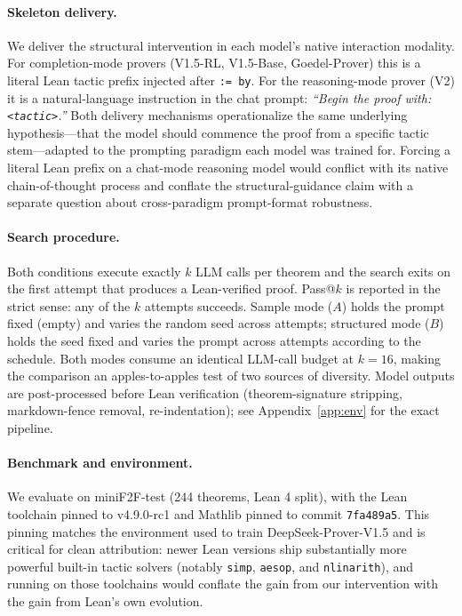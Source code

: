 \documentclass{article}
\begin{document}
\paragraph{Skeleton delivery.}
We deliver the structural intervention in each model's native interaction modality. For completion-mode provers (V1.5-RL, V1.5-Base, Goedel-Prover) this is a literal Lean tactic prefix injected after \texttt{:= by}. For the reasoning-mode prover (V2) it is a natural-language instruction in the chat prompt: \emph{``Begin the proof with: \texttt{<tactic>}.''} Both delivery mechanisms operationalize the same underlying hypothesis---that the model should commence the proof from a specific tactic stem---adapted to the prompting paradigm each model was trained for. Forcing a literal Lean prefix on a chat-mode reasoning model would conflict with its native chain-of-thought process and conflate the structural-guidance claim with a separate question about cross-paradigm prompt-format robustness.

\paragraph{Search procedure.}
Both conditions execute exactly $k$ LLM calls per theorem and the search exits on the first attempt that produces a Lean-verified proof. Pass@$k$ is reported in the strict sense: any of the $k$ attempts succeeds. Sample mode ($A$) holds the prompt fixed (empty) and varies the random seed across attempts; structured mode ($B$) holds the seed fixed and varies the prompt across attempts according to the schedule. Both modes consume an identical LLM-call budget at $k{=}16$, making the comparison an apples-to-apples test of two sources of diversity. Model outputs are post-processed before Lean verification (theorem-signature stripping, markdown-fence removal, re-indentation); see Appendix~\ref{app:env} for the exact pipeline.

\paragraph{Benchmark and environment.}
We evaluate on miniF2F-test (244 theorems, Lean 4 split), with the Lean toolchain pinned to v4.9.0-rc1 and Mathlib pinned to commit \texttt{7fa489a5}. This pinning matches the environment used to train DeepSeek-Prover-V1.5 and is critical for clean attribution: newer Lean versions ship substantially more powerful built-in tactic solvers (notably \texttt{simp}, \texttt{aesop}, and \texttt{nlinarith}), and running on those toolchains would conflate the gain from our intervention with the gain from Lean's own evolution.
\end{document}
